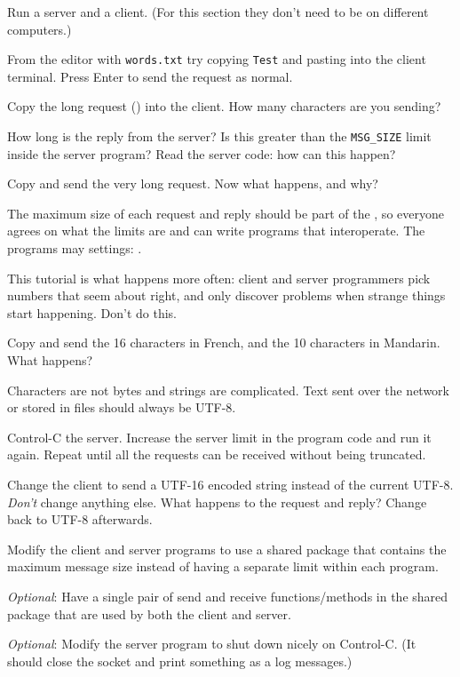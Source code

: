 Run a server and a client. (For this section they don't need to be on different
computers.)

From the editor with \texttt{words.txt} try copying \texttt{Test} and pasting into
the client terminal. Press Enter to send the request as normal.

\STEP Copy the long request () into the client. How many characters
are you sending?

How long is the reply from the server? Is this greater than the \texttt{MSG\_SIZE}
limit inside the server program? Read the server code: how can this happen?

\STEP Copy and send the very long request. Now what happens, and why?

\begin{IMPORTANT}
The maximum size of each request and reply should be part of the , so everyone agrees on what the limits are and can write programs that
interoperate. The programs may  settings:  .

This tutorial is what happens more often: client and server programmers pick
numbers that seem about right, and only discover problems when strange things start
happening. Don't do this.
\end{IMPORTANT}

\STEP Copy and send the 16 characters in French, and the 10 characters in Mandarin.
What happens?

\begin{IMPORTANT}
Characters are not bytes and strings are complicated. Text sent over the network
or stored in files should always be UTF-8.
\end{IMPORTANT}

\STEP Control-C the server. Increase the server limit in the program code and run it
again. Repeat until all the requests can be received without being truncated.



Change the client  to send a UTF-16 encoded string instead of the
current UTF-8. \emph{Don't} change anything else. What happens to the request and
reply? Change back to UTF-8 afterwards.

Modify the client and server programs to use a shared package that contains the
maximum message size instead of having a separate limit within each program.

\emph{Optional}: Have a single pair of send and receive functions/methods
in the shared package that are used by both the client and server.

\emph{Optional}: Modify the server program to shut down nicely on Control-C.
(It should close the socket and print something as a log messages.)


\COPYRIGHT


